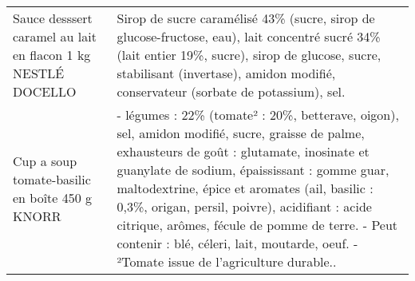 \begin{longtable}{p{5cm}p{10cm}}
                                             Sauce desssert caramel au lait en flacon 1 kg NESTLÉ DOCELLO &                                                                                                                                                                                                                                                                                                                                                                                                                                                                                                                                                                                                                                                                                                                                                                                                    Sirop de sucre caramélisé 43\% (sucre, sirop de glucose-fructose, eau), lait concentré sucré 34\% (lait entier 19\%, sucre), sirop de glucose, sucre, stabilisant (invertase), amidon modifié, conservateur (sorbate de potassium), sel. \\
                                                           Cup a soup tomate-basilic en boîte 450 g KNORR &                                                                                                                                                                                                                                                                                                                                                                                                                                                                                                                                                                                          - légumes : 22\% (tomate² : 20\%, betterave, oigon), sel, amidon modifié, sucre, graisse de palme, exhausteurs de goût : glutamate, inosinate et guanylate de sodium, épaississant : gomme guar, maltodextrine, épice et aromates (ail, basilic : 0,3\%, origan, persil, poivre), acidifiant : acide citrique, arômes, fécule de pomme de terre.  - Peut contenir : blé, céleri, lait, moutarde, oeuf.  - ²Tomate issue de l'agriculture durable.. \\

\end{longtable}
